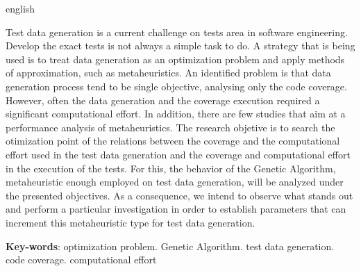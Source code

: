 \begin{resumo}[Abstract]
 \begin{otherlanguage*}{english}
   
Test data generation is a current challenge on tests area in software engineering. Develop the exact tests is not always a simple task to do. A strategy that is being used is to treat data generation as an optimization problem and apply methods of approximation, such as metaheuristics. An identified problem is that data generation process tend to be single objective, analysing only the code coverage. However, often the data generation and the coverage execution required a significant computational effort. In addition, there are few studies that aim at a performance analysis of metaheuristics. The research objetive is to search the otimization point of the relations between the coverage and the computational effort used in the test data generation and the coverage and computational effort in the execution of the tests. For this, the behavior of the Genetic Algorithm, metaheuristic enough employed on test data generation, will be analyzed under the presented objectives. As a consequence, we intend to observe what stands out and perform a particular investigation in order to establish parameters that can increment this metaheuristic type for test data generation.

   \vspace{\onelineskip}
 
   \noindent 
   \textbf{Key-words}: optimization problem. Genetic Algorithm. test data generation. code coverage. computational effort
 \end{otherlanguage*}
\end{resumo}